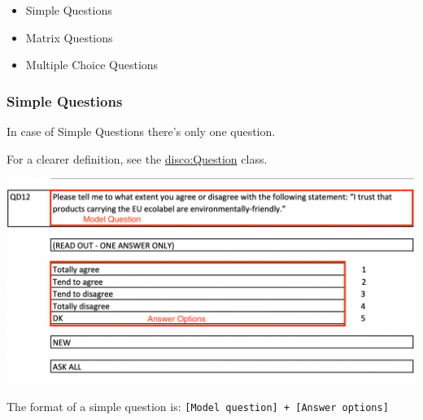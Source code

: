 \documentclass[
  letterpaper,
  DIV=11,
  numbers=noendperiod]{scrreprt}
\providecommand{\tightlist}{%
  \setlength{\itemsep}{0pt}\setlength{\parskip}{0pt}}\usepackage{longtable,booktabs,array}
\begin{document}
\begin{itemize}
\tightlist
\item
  Simple Questions
\end{itemize}

\begin{itemize}
\item
  Matrix Questions
\item
  Multiple Choice Questions
\end{itemize}

\subsubsection{Simple Questions}\label{simple-questions}

In case of Simple Questions there's only one question.

\begin{tcolorbox}[enhanced jigsaw, opacityback=0, bottomrule=.15mm, rightrule=.15mm, toptitle=1mm, breakable, colbacktitle=quarto-callout-note-color!10!white, colback=white, title=\textcolor{quarto-callout-note-color}{\faInfo}\hspace{0.5em}{Note}, leftrule=.75mm, toprule=.15mm, left=2mm, arc=.35mm, colframe=quarto-callout-note-color-frame, coltitle=black, titlerule=0mm, bottomtitle=1mm, opacitybacktitle=0.6]

For a clearer definition, see the
\href{https://rdf-vocabulary.ddialliance.org/discovery.html\#question}{disco:Question}
class.

\end{tcolorbox}

\begin{center}
\includegraphics{png/question_to_wikibase/question_simple_2x1.png}
\end{center}
The format of a simple question is:
\texttt{{[}Model\ question{]}\ +\ {[}Answer\ options{]}}
\end{document}
